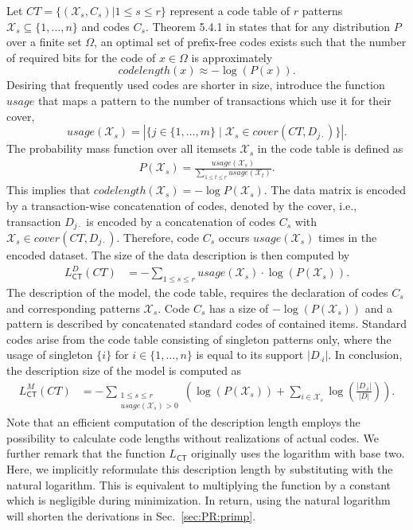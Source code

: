 Let $CT=\{(\mathcal{X}_s,C_s)|1\leq s\leq r\}$ represent a code table of $r$ patterns $\mathcal{X}_s\subseteq\{1,\ldots,n\}$ and codes $C_s$. Theorem 5.4.1 in \cite{cover2012elements} states that for any distribution $P$ over a finite set $\Omega$, an optimal set of prefix-free codes exists such that the number of required bits for the code of $x\in\Omega$ is approximately
\begin{equation*}
	codelength(x) \approx -\log(P(x)).
\end{equation*}
Desiring that frequently used codes are shorter in size, \cite{siebes2006item} introduce the function $usage$ that maps a pattern to the number of transactions which use it for their cover,
\[usage(\mathcal{X}_s)=|\{j\in\{1,\ldots,m\}\mid \mathcal{X}_s\in cover(CT,D_{j\cdot})\}|.\] 
The probability mass function over all itemsets $\mathcal{X}_s$ in the code table  is defined as
\begin{align}\label{eq:krimpCodeProb}
P(\mathcal{X}_s) = \frac{usage(\mathcal{X}_s)}{\sum_{1\leq t \leq r}usage(\mathcal{X}_t)}.
\end{align}
This implies that $codelength(\mathcal{X}_s)=-\log P(\mathcal{X}_s)$. The data matrix is encoded by a transaction-wise concatenation of codes, denoted by the cover, i.e., transaction $D_{j\cdot}$ is encoded by a concatenation of codes $C_s$ with $\mathcal{X}_s\in cover(CT,D_{j\cdot})$. Therefore, code $C_s$ occurs $usage(\mathcal{X}_s)$ times in the encoded dataset. The size of the data description is then computed by
\begin{align*}
	L^D_{\mathsf{CT}}(CT)
    &=-\sum_{1\leq s\leq r} usage(\mathcal{X}_s) \cdot \log(P(\mathcal{X}_s)).
\end{align*}
The description of the model, the code table, requires the declaration of codes $C_s$ and corresponding patterns $\mathcal{X}_s$. Code $C_s$ has a size of $-\log\left(P(\mathcal{X}_s)\right)$ and a pattern is described by concatenated standard codes of contained items. Standard codes arise from the code table consisting of singleton patterns only, where the usage of singleton $\{i\}$ for $i\in\{1,\ldots,n\}$ is equal to its support $|D_{\cdot i}|$. In conclusion, the description size of the model is computed as  
\begin{align*}
	L_{\mathsf{CT}}^M(CT)
    &= -\sum_{\substack{1\leq s\leq r \\ usage(\mathcal{X}_s)>0}}\left(\log\left(P(\mathcal{X}_s)\right) +\sum_{i\in \mathcal{X}_s}\log\left(\frac{|D_{\cdot i}|}{|D|}\right)\right).
\end{align*}
Note that an efficient computation of the description length employs the possibility to calculate code lengths without realizations of actual codes.
We further remark that the function $L_{\mathsf{CT}}$ originally uses the logarithm with base two. Here, we implicitly reformulate this description length by substituting with the natural logarithm. This is equivalent to multiplying the function by a constant which is negligible during minimization. In return, using the natural logarithm will shorten the derivations in Sec.~\ref{sec:PR:primp}.


